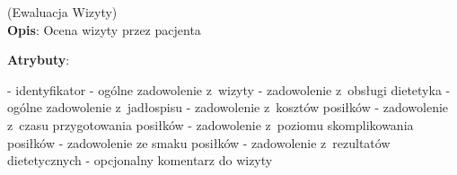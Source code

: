\begin{enumerate}[label={\textbf{KAT/3/\protect\twodigits{\theenumi}}}, wide, labelwidth=!, labelindent=0pt, labelsep=0pt, series=reqs]
    \label{kat:AppointmentEvaluation} (Ewaluacja Wizyty)\\
    \indent\textbf{Opis}: Ocena wizyty przez pacjenta
    \par
    \textbf{Atrybuty}:
    \begin{itemize}[series=atr, wide, align=left, leftmargin=190pt]
        \label{kat:AppointmentEvaluation:id}- identyfikator
        \label{kat:AppointmentEvaluation:overallSatisfaction}- ogólne zadowolenie z~wizyty
        \label{kat:AppointmentEvaluation:dietitianServiceSatisfaction}- zadowolenie z~obsługi dietetyka
        \label{kat:AppointmentEvaluation:mealPlanOverallSatisfaction}- ogólne zadowolenie z~jadłospisu
        \label{kat:AppointmentEvaluation:mealCostSatisfaction}- zadowolenie z~kosztów posiłków
        \label{kat:AppointmentEvaluation:mealPreparationTimeSatisfaction}- zadowolenie z~czasu przygotowania posiłków
        \label{kat:AppointmentEvaluation:mealComplexityLevelSatisfaction}- zadowolenie z~poziomu skomplikowania posiłków
        \label{kat:AppointmentEvaluation:mealTastefulnessSatisfaction}- zadowolenie ze smaku posiłków
        \label{kat:AppointmentEvaluation:dietaryResultSatisfaction}- zadowolenie z~rezultatów dietetycznych
        \label{kat:AppointmentEvaluation:comment}- opcjonalny komentarz do wizyty
    \end{itemize}


\end{enumerate}
